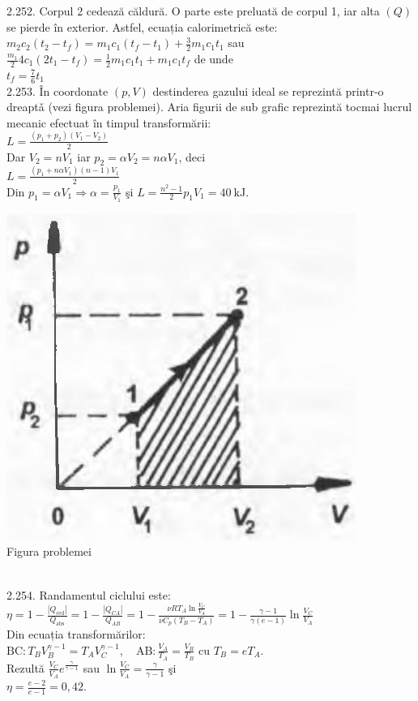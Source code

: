 2.252. Corpul 2 cedează căldură. O parte este preluată de corpul 1, iar alta $(Q)$ se pierde în exterior. Astfel, ecuația calorimetrică este:\\ $m_{2} c_{2}\left(t_{2}-t_{f}\right)=m_{1} c_{1}\left(t_{f}-t_{1}\right)+\frac{3}{2} m_{1} c_{1} t_{1}$ sau\\ $\frac{m_{1}}{2} 4 c_{1}\left(2 t_{1}-t_{f}\right)=\frac{1}{2} m_{1} c_{1} t_{1}+m_{1} c_{1} t_{f}$ de unde\\ $t_{f}=\frac{7}{6} t_{1}$\\

2.253. În coordonate $(p, V)$ destinderea gazului ideal se reprezintă printr-o dreaptǎ (vezi figura problemei). Aria figurii de sub grafic reprezintă tocmai lucrul mecanic efectuat în timpul transformării:\\ $L=\frac{\left(p_{1}+p_{2}\right)\left(V_{1}-V_{2}\right)}{2}$\\ Dar $V_{2}=n V_{1}$ iar $p_{2}=\alpha V_{2}=n \alpha V_{1}$, deci\\ $L=\frac{\left(p_{1}+n \alpha V_{1}\right)(n-1) V_{1}}{2}$\\ Din $p_{1}=\alpha V_{1} \Rightarrow \alpha=\frac{p_{1}}{V_{1}}$ şi $L=\frac{n^{2}-1}{2} p_{1} V_{1}=40 \mathrm{~kJ}$.\\ \begin{center} \includegraphics[width=0.4\linewidth]{images/2025_07_01_5b3ff9fa0d508c8e9f17g-325(1)}\\ Figura problemei \end{center}\\

2.254. Randamentul ciclului este:\\ $\eta=1-\frac{\left|Q_{\text{ced}}\right|}{Q_{\text{abs}}}=1-\frac{\left|Q_{C A}\right|}{Q_{A B}}=1-\frac{\nu R T_{A} \ln \frac{V_{C}}{V_{A}}}{\nu C_{p}\left(T_{B}-T_{A}\right)}=1-\frac{\gamma-1}{\gamma(e-1)} \ln \frac{V_{C}}{V_{A}}$\\ Din ecuația transformărilor:\\ $\mathrm{BC}: T_{B} V_{B}^{\gamma-1}=T_{A} V_{C}^{\gamma-1}, \quad \mathrm{AB}: \frac{V_{A}}{T_{A}}=\frac{V_{B}}{T_{B}} \text { cu } T_{B}=e T_{A}$.\\ Rezultă $\frac{V_{C}}{V_{A}} e^{\frac{\gamma}{\gamma-1}}$ sau $\ln \frac{V_{C}}{V_{A}}=\frac{\gamma}{\gamma-1}$ şi\\ $\eta=\frac{e-2}{e-1}=0,42$.\\

